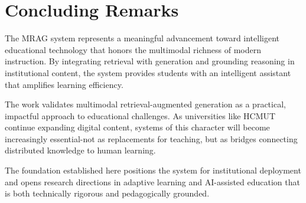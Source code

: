 \section{Concluding Remarks}

The MRAG system represents a meaningful advancement toward intelligent educational technology that honors the multimodal richness of modern instruction. By integrating retrieval with generation and grounding reasoning in institutional content, the system provides students with an intelligent assistant that amplifies learning efficiency.

The work validates multimodal retrieval-augmented generation as a practical, impactful approach to educational challenges. As universities like HCMUT continue expanding digital content, systems of this character will become increasingly essential-not as replacements for teaching, but as bridges connecting distributed knowledge to human learning.

The foundation established here positions the system for institutional deployment and opens research directions in adaptive learning and AI-assisted education that is both technically rigorous and pedagogically grounded.

\newpage
